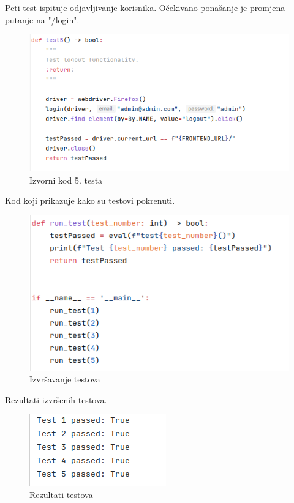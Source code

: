 			Peti test ispituje odjavljivanje korisnika. Očekivano ponašanje je promjena putanje na "/login".
			
			\begin{figure}[H]
				\includegraphics[width=\textwidth]{slike/selenium_test5.png}
				\centering
				\caption{Izvorni kod 5. testa}
				\label{fig:izvorni-kod-testa-5}
			\end{figure}
		
			Kod koji prikazuje kako su testovi pokrenuti.
			
			\begin{figure}[H]
				\includegraphics[width=\textwidth]{slike/selenium_running.png}
				\centering
				\caption{Izvršavanje testova}
				\label{fig:izvrsavanje-testova}
			\end{figure}
		
			Rezultati izvršenih testova.
			
			\begin{figure}[H]
				\includegraphics[width=\textwidth]{slike/selenium_results.png}
				\centering
				\caption{Rezultati testova}
				\label{fig:rezultati-testova}
			\end{figure}
				
